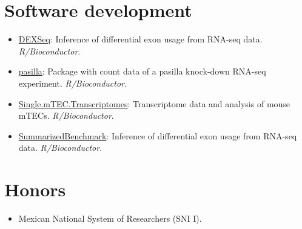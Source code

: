 \documentclass[11pt,a4paper,sans]{moderncv} %
\begin{document}
\section{Software development}
\vspace{-.1cm}
\begin{itemize}
\item \href{http://www.bioconductor.org/packages/release/bioc/html/DEXSeq.html}{DEXSeq}: Inference of differential exon usage from RNA-seq data. \textit{R/Bioconductor}.
\item \href{http://bioconductor.org/packages/release/data/experiment/html/pasilla.html}{pasilla}: Package with count data of a pasilla knock-down RNA-seq experiment. \textit{R/Bioconductor}.
\item \href{http://bioconductor.org/packages/release/data/experiment/html/Single.mTEC.Transcriptomes.html}{Single.mTEC.Transcriptomes}: Transcriptome data and analysis of mouse mTECs. \textit{R/Bioconductor}.
\item \href{http://www.bioconductor.org/packages/release/bioc/html/SummarizedBenchmark.html}{SummarizedBenchmark}: Inference of differential exon usage from RNA-seq data. \textit{R/Bioconductor}.
\end{itemize}
\vspace{-.2cm}

\section{Honors}
\begin{itemize}
\item Mexican National System of Researchers (SNI I). \\
\end{itemize}
\end{document}
